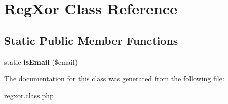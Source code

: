 \hypertarget{classRegXor}{
\section{RegXor Class Reference}
\label{classRegXor}
}
\subsection*{Static Public Member Functions}
\begin{DoxyCompactItemize}
\item 
\hypertarget{classRegXor_a233bd794dc510dc069d00d42f94a70a8}{
static {\bfseries isEmail} (\$email)}
\label{classRegXor_a233bd794dc510dc069d00d42f94a70a8}

\end{DoxyCompactItemize}


The documentation for this class was generated from the following file:\begin{DoxyCompactItemize}
\item 
regxor.class.php\end{DoxyCompactItemize}
